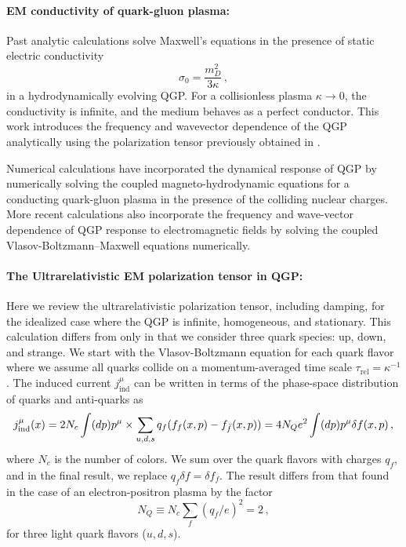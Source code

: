 \paragraph{EM conductivity of quark-gluon plasma:}

Past analytic calculations \cite{Tuchin:2010vs,Deng:2012pc,McLerran:2013hla,Tuchin:2013apa,Gursoy:2014aka,Li:2016tel,Roy:2015kma} solve Maxwell's equations in the presence of static electric conductivity 
\begin{equation}
   \sigma_0 = \frac{m_D^2}{3\kappa}\,,
\end{equation} 
in a  hydrodynamically evolving QGP. For a collisionless plasma $\kappa\rightarrow0$, the conductivity is infinite, and the medium behaves as a perfect conductor. This work introduces the frequency and wavevector dependence of the QGP analytically using the polarization tensor previously obtained in \cite{Formanek:2021blc}.

Numerical calculations \cite{Inghirami:2016iru,Inghirami:2019mkc} have incorporated the dynamical response of QGP by numerically solving the coupled magneto-hydrodynamic equations for a conducting quark-gluon plasma in the presence of the colliding nuclear charges. More recent calculations \cite{Yan:2021zjc,Wang:2021oqq} also incorporate the frequency and wave-vector dependence of QGP response to electromagnetic fields by solving the coupled Vlasov-Boltzmann--Maxwell equations numerically.



\paragraph{The Ultrarelativistic EM polarization tensor in QGP:}\label{sec:linresp}

Here we review the ultrarelativistic polarization tensor, including damping, for the idealized case where the QGP is infinite, homogeneous, and stationary. This calculation differs from \cite{Formanek:2021blc} only in that we consider three quark species: up, down, and strange. We start with the Vlasov-Boltzmann equation for each quark flavor  where we assume all quarks collide on a momentum-averaged time scale $\tau_{\text{rel}} = \kappa^{-1}$. The induced current $ j_{\mathrm{ind}}^\mu$ can be written in terms of the phase-space distribution of quarks and anti-quarks as
\begin{equation}\label{eq:current}
   j_{\mathrm{ind}}^\mu(x) = 2 N_c \int (dp)p^\mu \\ \times \sum_{u,d,s} q_f (f_{f}(x,p) - f_{\bar{f}}(x,p))=  4 N_Q e^2 \int (dp)p^\mu \delta f(x,p)\,,
\end{equation}
where  $N_c$ is the number of colors. We sum over the quark flavors with charges $q_f$, and in the final result, we replace $q_f \delta f = \delta f_f$. The result  differs from that found in the case of an electron-positron plasma by the factor
\begin{equation}
N_Q \equiv N_c\sum_f (q_f/e)^2 = 2\,,
\end{equation}
for three light quark flavors ($u,d,s$).


